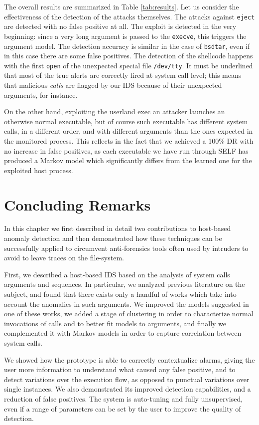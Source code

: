 The overall results are summarized in Table \ref{tab:results}. Let us consider the effectiveness of the detection of the attacks themselves. The attacks against \texttt{eject} are detected with no false positive at all. The exploit is detected in the very beginning: since a very long argument is passed to the \texttt{execve}, this triggers the argument model. The detection accuracy is similar in the case of \texttt{bsdtar}, even if in this case there are some false positives. The detection of the shellcode happens with the first \texttt{open} of the unexpected special file \texttt{/dev/tty}. It must be underlined that most of the true alerts are correctly fired at system call level; this means that malicious \emph{calls} are flagged by our \ac{IDS} because of their unexpected arguments, for instance.

On the other hand, exploiting the userland exec an attacker launches an otherwise normal executable, but of course such executable has different system calls, in a different order, and with different arguments than the ones expected in the monitored process. This reflects in the fact that we achieved a 100\% \ac{DR} with no increase in false positives, as each executable we have run through SELF has produced a Markov model which significantly differs from the learned one for the exploited host process.

\section{Concluding Remarks}
\label{host:conclusions}
In this chapter we first described in detail two contributions to host-based anomaly detection and then demonstrated how these techniques can be successfully applied to circumvent anti-forensics tools often used by intruders to avoid to leave traces on the file-system.

First, we described a host-based \ac{IDS} based on the analysis of system calls arguments and sequences. In particular, we analyzed previous literature on the subject, and found that there exists only a handful of works which take into account the anomalies in such arguments. We improved the models suggested in one of these works, we added a stage of clustering in order to characterize normal invocations of calls and to better fit models to arguments, and finally we complemented it with Markov models in order to capture correlation between system calls. 

We showed how the prototype is able to correctly contextualize alarms, giving the user more information to understand what caused any false positive, and to detect variations over the execution flow, as opposed to punctual variations over single instances. We also demonstrated its improved detection capabilities, and a reduction of false positives. The system is auto-tuning and fully unsupervised, even if a range of parameters can be set by the user to improve the quality of detection.

